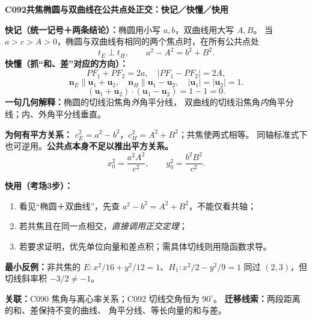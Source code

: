\clearpage
\begin{summarybox}
\textbf{C092\quad 共焦椭圆与双曲线在公共点处正交：快记／快懂／快用}

\textbf{快记（统一记号＋两条结论）：}椭圆用小写 $a,b$，双曲线用大写 $A,B$。
当 $a>c>A>0$，椭圆与双曲线有相同的两个焦点时，在所有公共点处
\[
\boxed{t_E\perp t_H},\qquad \boxed{a^2-A^2=b^2+B^2}.
\]
\textbf{快懂（抓“和、差”对应的方向）：}
\[
PF_1+PF_2=2a,\quad|PF_1-PF_2|=2A,
\]
\[
\mathbf n_E\parallel\mathbf u_1+\mathbf u_2,\quad
\mathbf n_H\parallel\mathbf u_1-\mathbf u_2,
\quad |\mathbf u_1|=|\mathbf u_2|=1.
\]
\[
\boxed{(\mathbf u_1+\mathbf u_2)\cdot
(\mathbf u_1-\mathbf u_2)=1-1=0}.
\]
\textbf{一句几何解释：}椭圆的切线沿焦角\emph{外}角平分线，
双曲线的切线沿焦角\emph{内}角平分线；内、外角平分线垂直。

\textbf{为何有平方关系：}
$c_E^2=a^2-b^2$，$c_H^2=A^2+B^2$；共焦使两式相等。
同轴标准式下也可逆用。\textbf{公共点本身不足以推出平方关系。}
\[\boxed{x_0^2=\frac{a^2A^2}{c^2}},\qquad
\boxed{y_0^2=\frac{b^2B^2}{c^2}}.\]

\textbf{快用（考场3步）：}
\begin{enumerate}
\item 看见“椭圆＋双曲线”，先查 $a^2-b^2=A^2+B^2$，不能仅看共轴；
\item 若共焦且在同一点相交，\emph{直接调用正交定理}；
\item 若要求证明，优先单位向量和差点积；需具体切线则用隐函数求导。
\end{enumerate}
\textbf{最小反例：}非共焦的
$E:x^2/16+y^2/12=1$、$H_1:x^2/2-y^2/9=1$
同过 $(2,3)$，但切线斜率积 $-3/2\ne-1$。

\textbf{关联：}C090 焦角与离心率关系；C092 切线交角恒为 $90^\circ$。
\textbf{迁移线索：}两段距离的和、差保持不变的曲线、
角平分线、等长向量的和与差。
\end{summarybox}
